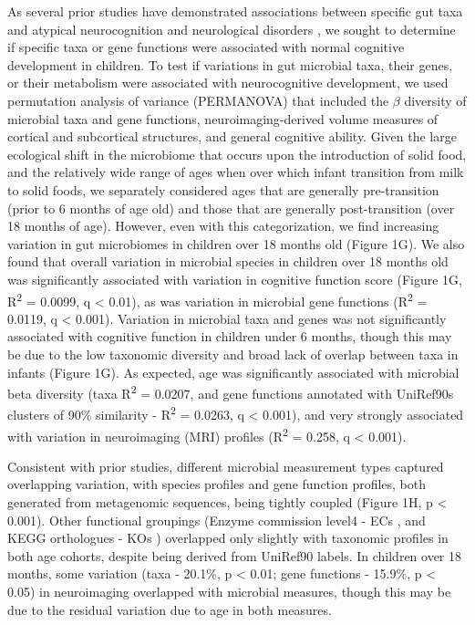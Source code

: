 \documentclass{article}
\begin{document}
As several prior studies have demonstrated associations between specific gut taxa
and atypical neurocognition and neurological disorders
\cite{liuAlteredGutMicrobiota2019,wanUnderdevelopmentGutMicrobiota2021,
      magnussonRelationshipsDietrelatedChanges2015,mayneris-perxachsMicrobiotaAlterationsProline2022,
      needhamGutderivedMetaboliteAlters2022},
we sought to determine if specific taxa or gene functions were associated
with normal cognitive development in children.
To test if variations in gut microbial taxa,
their genes, or their metabolism were associated with neurocognitive
development, we used permutation analysis of variance (PERMANOVA) 
that included the $\beta$ diversity of microbial taxa and gene functions,
neuroimaging-derived volume measures of cortical and subcortical structures,
and general cognitive ability.
Given the large ecological shift in the microbiome that occurs upon the introduction of solid food,
and the relatively wide range of ages when over which infant transition from milk to solid foods,
we separately considered ages that are generally pre-transition (prior to 6 months of age old)
and those that are generally post-transition (over 18 months of age).
However, even with this categorization, we find increasing variation
in gut microbiomes in children over 18 months old (Figure 1G).
We also found that overall variation in microbial species in children over 18 months old
was significantly associated with variation in cognitive function score
(Figure 1G, R\textsuperscript{2} = 0.0099, q \textless{} 0.01),
as was variation in microbial gene functions (R\textsuperscript{2} = 0.0119, q \textless{} 0.001).
Variation in microbial taxa and genes was not significantly associated with cognitive
function in children under 6 months, though this may be due to the low
taxonomic diversity and broad lack of overlap between taxa in infants (Figure 1G).
As expected, age was significantly associated with microbial beta
diversity (taxa R\textsuperscript{2} = 0.0207, and  gene functions
annotated with UniRef90s clusters of 90\% similarity
\cite{suzekUniRefComprehensiveNonredundant2007} -
R\textsuperscript{2} = 0.0263, q \textless{} 0.001), and very strongly
associated with variation in neuroimaging (MRI) profiles (R\textsuperscript{2} = 0.258, q
\textless{} 0.001).

Consistent with prior studies, different microbial measurement types
captured overlapping variation, with species profiles and gene function
profiles, both generated from metagenomic sequences, being tightly coupled
(Figure 1H, p \textless{} 0.001). Other functional
groupings (Enzyme commission level4 - ECs
\cite{bairochENZYMEDatabase20002000},
and KEGG orthologues - KOs
\cite{kanehisaKEGGResourceDeciphering2004})
overlapped only slightly with taxonomic profiles in both age
cohorts, despite being derived from UniRef90 labels. In children over 18
months, some variation (taxa - 20.1\%, p \textless{} 0.01;
gene functions - 15.9\%, p \textless{} 0.05) in neuroimaging
overlapped with microbial measures, though this may be due to the
residual variation due to age in both measures.
\end{document}

